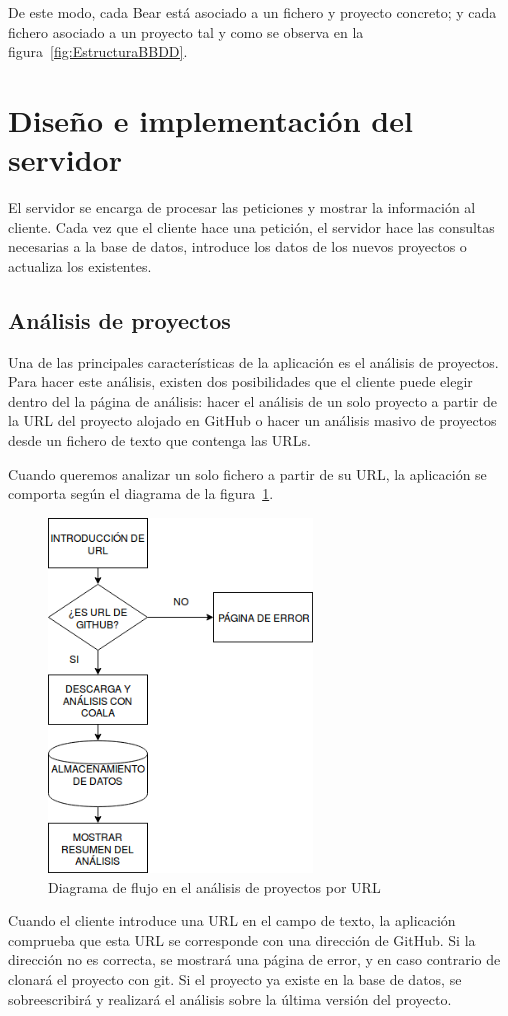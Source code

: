 \documentclass[a4paper, 12pt]{book}
\begin{document}
De este modo, cada Bear está asociado a un fichero y proyecto concreto; y cada fichero asociado a un proyecto tal y como se observa en la figura~\ref{fig:EstructuraBBDD}.

\section{Diseño e implementación del servidor} 
\label{sec:seccion12}
El servidor se encarga de procesar las peticiones y mostrar la información al cliente. Cada vez que el cliente hace una petición, el servidor hace las consultas necesarias a la base de datos, introduce los datos de los nuevos proyectos o actualiza los existentes.

\subsection{Análisis de proyectos}
\label{sec:seccion12.1}
Una de las principales características de la aplicación es el análisis de proyectos. Para hacer este análisis, existen dos posibilidades que el cliente puede elegir dentro del la página de análisis: hacer el análisis de un solo proyecto a partir de la URL del proyecto alojado en GitHub o hacer un análisis masivo de proyectos desde un fichero de texto que contenga las URLs.

Cuando queremos analizar un solo fichero a partir de su URL, la aplicación se comporta según el diagrama de la figura~\ref{fig:AnalizarURL}.
\begin{figure}[H]
  \centering
  \includegraphics[width=7cm, keepaspectratio]{img/AnalizarURL}
  \caption{Diagrama de flujo en el análisis de proyectos por URL}
  \label{fig:AnalizarURL}
\end{figure}
Cuando el cliente introduce una URL en el campo de texto, la aplicación comprueba que esta URL se corresponde con una dirección de GitHub. Si la dirección no es correcta, se mostrará una página de error, y en caso contrario de clonará el proyecto con git. Si el proyecto ya existe en la base de datos, se sobreescribirá y realizará el análisis sobre la última versión del proyecto.
\end{document}
